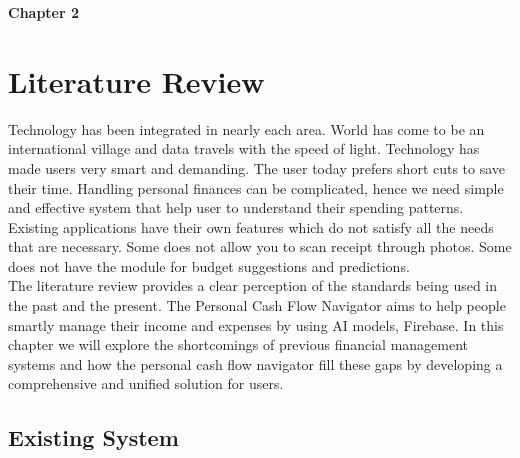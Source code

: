 \documentclass[12pt]{article}
\begin{document}
\vspace*{2cm} %

\noindent
\LARGE \textbf{Chapter 2}

\vspace{0.5cm}

\noindent
\section{Literature Review}

\vspace{1cm} %

\noindent
\normalsize Technology has been integrated in nearly each area. World has come to be an international village and data travels with the speed of light. Technology has made users very smart and demanding. The user today prefers short cuts to save their time. Handling personal finances can be complicated, hence we need simple and effective system that help user to understand their spending patterns. Existing applications have their own features which do not satisfy all the needs that are necessary. Some does not allow you to scan receipt through photos. Some does not have the module for budget suggestions and predictions.\\
The literature review provides a clear perception of the standards being used in the past and the present. The Personal Cash Flow Navigator aims to help people smartly manage their income and expenses by using AI models, Firebase. In this chapter we will explore the shortcomings of previous financial management systems and how the personal cash flow navigator fill these gaps by developing a comprehensive and unified solution for users. 



\vspace{1cm} %

\noindent
\subsection{Existing System}

\vspace{0.5cm}
\end{document}
